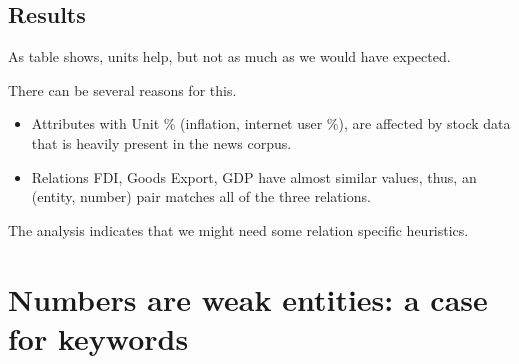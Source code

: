 \documentclass[a4paper,10pt]{article}
\begin{document}
\subsection{Results}
As table \cite{fig:resunits} shows, units help, but not as much as we would have expected.
\begin{center}
\begin{table}[H]
\caption{Unit Based}
\label{fig:resunits}
\end{table}
\end{center}

There can be several reasons for this.
 \begin{itemize}
  \item Attributes with Unit \% (inflation, internet user \%), are affected by stock data that is heavily present in the news corpus.
  \item Relations FDI, Goods Export, GDP have almost similar values, thus, an (entity, number) pair matches all of the three relations. 
  \end{itemize}
  
The analysis indicates that we might need some relation specific heuristics.
 

\section{Numbers are weak entities: a case for keywords}
\end{document}
